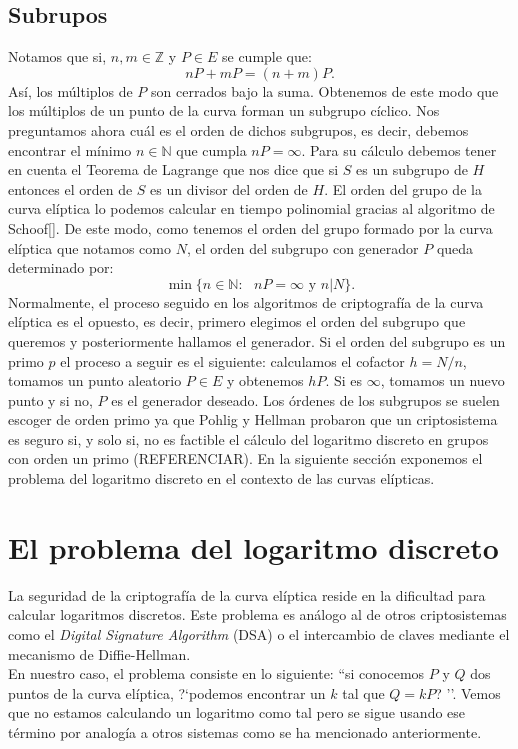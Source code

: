 \documentclass[11pt]{article}
\begin{document}
\subsection{Subrupos}
Notamos que si, $ n, m \in \mathbb{Z} $ y $ P \in E $ se cumple que:
\[
nP + mP = (n+m)P.
\]
Así, los múltiplos de $ P $ son cerrados bajo la suma. Obtenemos de este modo que los múltiplos de un punto de la curva forman un subgrupo cíclico. Nos preguntamos ahora cuál es el orden de dichos subgrupos, es decir, debemos encontrar el mínimo $ n \in \mathbb{N} $ que cumpla $ nP = \infty $. Para su cálculo debemos tener en cuenta el Teorema de Lagrange que nos dice que si $ S $ es un subgrupo de $ H $ entonces el orden de $ S $ es un divisor del orden de $ H $. El orden del grupo de la curva elíptica lo podemos calcular en tiempo polinomial gracias al algoritmo de Schoof[]. De este modo, como tenemos el orden del grupo formado por la curva elíptica que notamos como $ N $, el orden del subgrupo con generador $ P $ queda determinado por:
\[
\min\{ n \in \mathbb{N}:\text{ } nP = \infty \text{ y } n | N\}.
\]
Normalmente, el proceso seguido en los algoritmos de criptografía de la curva elíptica es el opuesto, es decir, primero elegimos el orden del subgrupo que queremos y posteriormente hallamos el generador. Si el orden del subgrupo es un primo $ p $ el proceso a seguir es el siguiente: calculamos el cofactor $ h = N/n $, tomamos un punto aleatorio $ P \in E $ y obtenemos $ hP $. Si es $\infty$, tomamos un nuevo punto y si no, $ P $ es el generador deseado. Los órdenes de los subgrupos se suelen escoger de orden primo ya que Pohlig y Hellman probaron que un criptosistema es seguro si, y solo si, no es factible el cálculo del logaritmo discreto en grupos con orden un primo (REFERENCIAR). En la siguiente sección exponemos el problema del logaritmo discreto en el contexto de las curvas elípticas. \\
\section{El problema del logaritmo discreto}
\label{sec:log}
La seguridad de la criptografía de la curva elíptica reside en la dificultad para calcular logaritmos discretos. Este problema es análogo al de otros criptosistemas como el \textit{Digital Signature Algorithm} (DSA) o el intercambio de claves mediante el mecanismo de Diffie-Hellman.\\

En nuestro caso, el problema consiste en lo siguiente: ``si conocemos $ P $ y $ Q $ dos puntos de la curva elíptica, ?`podemos encontrar un $ k $ tal que $ Q = kP $? ''. Vemos que no estamos calculando un logaritmo como tal pero se sigue usando ese término por analogía a otros sistemas como se ha mencionado anteriormente.\\
\end{document}
